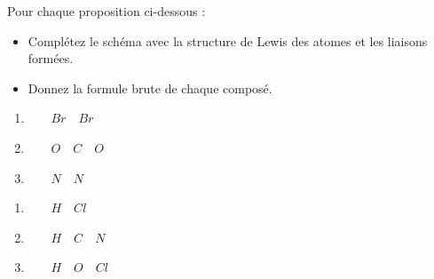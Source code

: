 \documentclass[
  11pt,
  french,
  a4paper,
  openany]{book}
\providecommand{\tightlist}{%
  \setlength{\itemsep}{0pt}\setlength{\parskip}{0pt}}
\begin{document}
\begin{Exercise}

Pour chaque proposition ci-dessous :

\begin{itemize}
\tightlist
\item
  Complétez le schéma avec la structure de Lewis des atomes et les liaisons formées.
\item
  Donnez la formule brute de chaque composé.
\end{itemize}

\begin{multicols}{3}

\begin{enumerate}
\def\labelenumi{\arabic{enumi}.}
\item
  ~~~ \(Br \quad Br\)
\item
  ~~~ \(O \quad C \quad O\)
\item
  ~~~ \(N \quad N\)
\end{enumerate}


\end{multicols}


\begin{multicols}{3}

\begin{enumerate}
\def\labelenumi{\arabic{enumi}.}
\setcounter{enumi}{3}
\item
  ~~~ \(H \quad Cl\)
\item
  ~~~ \(H \quad C \quad N\)
\item
  ~~~ \(H \quad O \quad Cl\)
\end{enumerate}


\end{multicols}



\end{Exercise}
\end{document}
